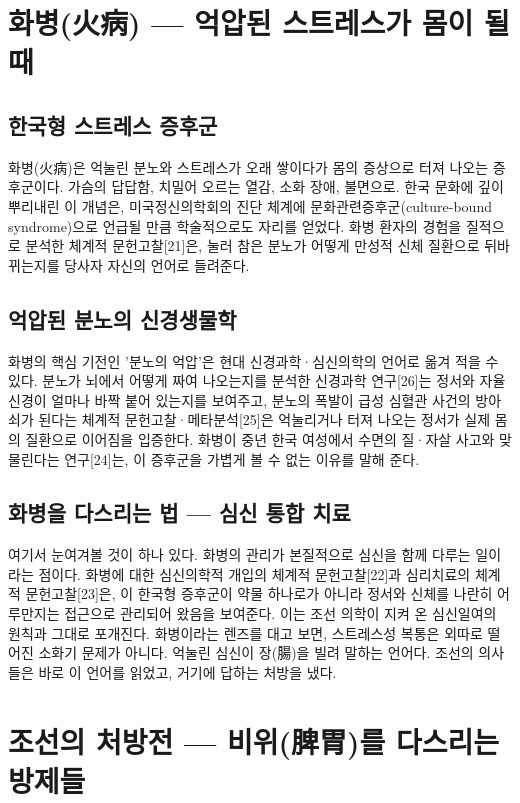 \documentclass[12pt,oneside]{book}
\begin{document}
\section{화병(火病) — 억압된 스트레스가 몸이 될 때}

\subsection{한국형 스트레스 증후군}

화병(火病)은 억눌린 분노와 스트레스가 오래 쌓이다가 몸의 증상으로 터져 나오는 증후군이다. 가슴의 답답함, 치밀어 오르는 열감, 소화 장애, 불면으로. 한국 문화에 깊이 뿌리내린 이 개념은, 미국정신의학회의 진단 체계에 문화관련증후군(culture-bound syndrome)으로 언급될 만큼 학술적으로도 자리를 얻었다. 화병 환자의 경험을 질적으로 분석한 체계적 문헌고찰[21]은, 눌러 참은 분노가 어떻게 만성적 신체 질환으로 뒤바뀌는지를 당사자 자신의 언어로 들려준다.

\subsection{억압된 분노의 신경생물학}

화병의 핵심 기전인 '분노의 억압'은 현대 신경과학·심신의학의 언어로 옮겨 적을 수 있다. 분노가 뇌에서 어떻게 짜여 나오는지를 분석한 신경과학 연구[26]는 정서와 자율신경이 얼마나 바짝 붙어 있는지를 보여주고, 분노의 폭발이 급성 심혈관 사건의 방아쇠가 된다는 체계적 문헌고찰·메타분석[25]은 억눌리거나 터져 나오는 정서가 실제 몸의 질환으로 이어짐을 입증한다. 화병이 중년 한국 여성에서 수면의 질·자살 사고와 맞물린다는 연구[24]는, 이 증후군을 가볍게 볼 수 없는 이유를 말해 준다.

\subsection{화병을 다스리는 법 — 심신 통합 치료}

여기서 눈여겨볼 것이 하나 있다. 화병의 관리가 본질적으로 심신을 함께 다루는 일이라는 점이다. 화병에 대한 심신의학적 개입의 체계적 문헌고찰[22]과 심리치료의 체계적 문헌고찰[23]은, 이 한국형 증후군이 약물 하나로가 아니라 정서와 신체를 나란히 어루만지는 접근으로 관리되어 왔음을 보여준다. 이는 조선 의학이 지켜 온 심신일여의 원칙과 그대로 포개진다. 화병이라는 렌즈를 대고 보면, 스트레스성 복통은 외따로 떨어진 소화기 문제가 아니다. 억눌린 심신이 장(腸)을 빌려 말하는 언어다. 조선의 의사들은 바로 이 언어를 읽었고, 거기에 답하는 처방을 냈다.

\section{조선의 처방전 — 비위(脾胃)를 다스리는 방제들}
\end{document}
